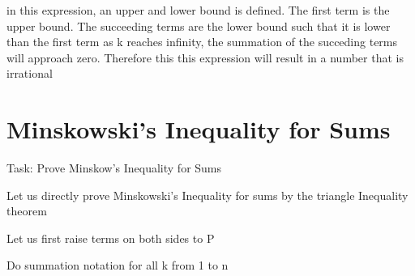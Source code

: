 \documentclass[12pt, a4paper]{article}
\begin{document}
\centering{\fontsize{17.28pt}{18pt}\selectfont

\[
  =  \frac{1}{a + 1} - \frac{1}{(a + 1)(a + 2)} + \dots
\]

}

\vspace{1cm}
\raggedright

in this expression, an upper and lower bound is defined. The first term is the 
upper bound. The succeeding terms are the lower bound such that it is lower than the first term
as k reaches infinity, the summation of the succeding terms will approach zero. Therefore this
this expression will result in a number that is irrational

\newpage
\raggedright
\section{Minskowski's Inequality for Sums}

Task: Prove Minskow's Inequality for Sums


\vspace{1cm}
\raggedright
Let us directly prove Minskowski's Inequality for sums by the
triangle Inequality theorem

\vspace{1cm}

\raggedright
Let us first raise terms on both sides to P

\centering{\fontsize{17.28pt}{18pt}\selectfont

\[
    |a + b|^{p} \leq |a|^{p} + |b|^{p}  
\]
}

\raggedright

Do summation notation for all k from 1 to n

\centering{\fontsize{17.28pt}{18pt}\selectfont

\[
  \sum_{k = 1}^{n} |a_k + b_k|^{p} \leq \sum_{k=1}^{n} |a_k|^{p} + \sum_{k =1 }^{n} |b_k|^{p} 
\]

}
\end{document}
